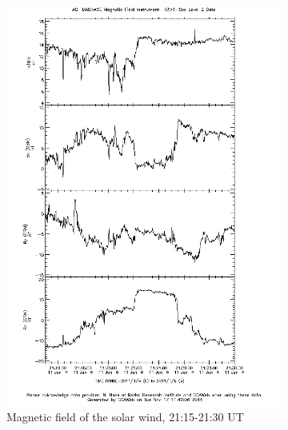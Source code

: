 \documentclass[10pt,a4paper]{article}
\begin{document}
\begin{figure}[h]
\begin{subfigure}[h]{.5\textwidth}
		\includegraphics[width=.8\linewidth]{ace-2115-2130-b.png}
		\caption{Magnetic field of the solar wind, 21:15-21:30 UT}
		\label{ace2}
	\end{subfigure}
	\begin{subfigure}[h]{.5\textwidth}
		\centering

\end{subfigure}
\end{figure}
\end{document}

